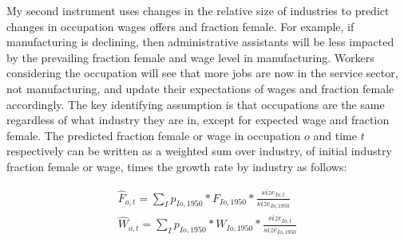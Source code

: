 \documentclass[12pt]{article}
\begin{document}







My second instrument uses changes in the relative size of industries to predict changes in occupation wages offers and fraction female. For example, if manufacturing is declining, then administrative assistants will be less impacted by the prevailing fraction female and wage level in manufacturing. Workers considering the occupation will see that more jobs are now in the service sector, not manufacturing, and update their expectations of wages and fraction female accordingly. The key identifying assumption is that occupations are the same regardless of what industry they are in, except for expected wage and fraction female. The predicted fraction female or wage in occupation $o$ and time $t$ respectively can be written as a weighted sum over industry, of initial industry fraction female or wage, times the growth rate by industry as follows:

\begin{align*}
\hat{F}_{o,t} = \sum_I p_{Io,1950}*F_{Io,1950}*\frac{size_{Io,t}}{size_{Io,1950}}\\
\hat{W}_{o,t} = \sum_I p_{Io,1950}*W_{Io,1950}*\frac{size_{Io,t}}{size_{Io,1950}}
\end{align*}
\end{document}
